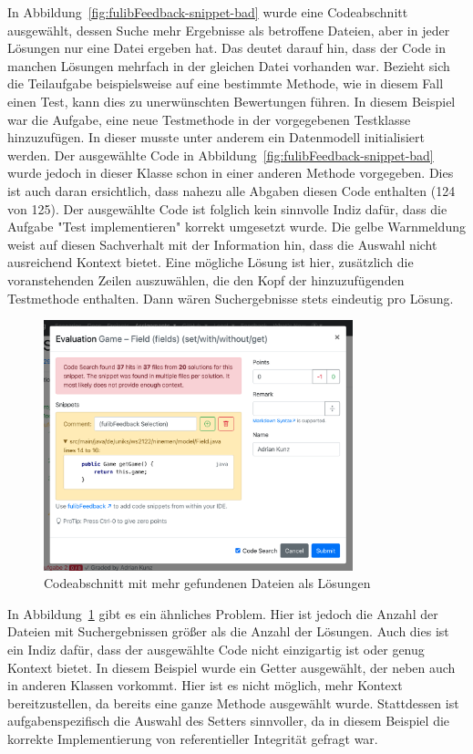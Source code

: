In Abbildung~\ref{fig:fulibFeedback-snippet-bad} wurde eine Codeabschnitt ausgewählt, dessen Suche mehr Ergebnisse als betroffene Dateien, aber in jeder Lösungen nur eine Datei ergeben hat.
Das deutet darauf hin, dass der Code in manchen Lösungen mehrfach in der gleichen Datei vorhanden war.
Bezieht sich die Teilaufgabe beispielsweise auf eine bestimmte Methode, wie in diesem Fall einen Test, kann dies zu unerwünschten Bewertungen führen.
In diesem Beispiel war die Aufgabe, eine neue Testmethode in der vorgegebenen Testklasse  hinzuzufügen.
In dieser musste unter anderem ein Datenmodell initialisiert werden.
Der ausgewählte Code in Abbildung~\ref{fig:fulibFeedback-snippet-bad} wurde jedoch in dieser Klasse schon in einer anderen Methode vorgegeben.
Dies ist auch daran ersichtlich, dass nahezu alle Abgaben diesen Code enthalten (124 von 125).
Der ausgewählte Code ist folglich kein sinnvolle Indiz dafür, dass die Aufgabe "Test implementieren" korrekt umgesetzt wurde.
Die gelbe Warnmeldung weist auf diesen Sachverhalt mit der Information hin, dass die Auswahl nicht ausreichend Kontext bietet.
Eine mögliche Lösung ist hier, zusätzlich die voranstehenden Zeilen auszuwählen, die den Kopf der hinzuzufügenden Testmethode enthalten.
Dann wären Suchergebnisse stets eindeutig pro Lösung.

\begin{figure}
    \centering
    \includegraphics[width=0.8\textwidth]{images/fulibFeedback-snippet-worst}
    \caption{Codeabschnitt mit mehr gefundenen Dateien als Lösungen}
    \label{fig:fulibFeedback-snippet-worst}
\end{figure}

In Abbildung~\ref{fig:fulibFeedback-snippet-worst} gibt es ein ähnliches Problem.
Hier ist jedoch die Anzahl der Dateien mit Suchergebnissen größer als die Anzahl der Lösungen.
Auch dies ist ein Indiz dafür, dass der ausgewählte Code nicht einzigartig ist oder genug Kontext bietet.
In diesem Beispiel wurde ein Getter ausgewählt, der neben  auch in anderen Klassen vorkommt.
Hier ist es nicht möglich, mehr Kontext bereitzustellen, da bereits eine ganze Methode ausgewählt wurde.
Stattdessen ist aufgabenspezifisch die Auswahl des Setters sinnvoller, da in diesem Beispiel die korrekte Implementierung von referentieller Integrität gefragt war.

